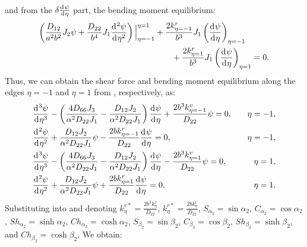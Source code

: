 \documentclass[preprint,12pt]{elsarticle}
\newcommand{\id}{\mathrm{d}\mkern1mu}
\begin{document}
%
and from the $\delta \frac{\id \psi}{\id \eta}$ part, the bending moment equilibrium:
%
\begin{equation}\label{eq:inertial_forcey2}	
 \begin{split}
 	\left( \frac{D_{12}}{a^2b^2} J_2 \psi + \frac{D_{22}}{b^4} J_1 \frac{\id^2 \psi}{\id \eta^2} \right) 
 	\Big|^{\eta=1}_{\eta=-1} 
 	&+ \frac{2k^r_{\eta=-1}}{b^3} J_1 \left( \frac{\id \psi}{\id \eta} \right)_{\eta=-1} \\
 	&\qquad+ \frac{2k^r_{\eta=1}}{b^3} J_1 \left( \frac{\id \psi}{\id \eta} \right)_{\eta=1}=0.
 \end{split}
\end{equation}
%
Thus, we can obtain the shear force and bending moment equilibrium along the edges $\eta = -1$ and $\eta = 1$ from , respectively, as:
%
\begin{subequations}\label{eq:boundaryy}
	\begin{align}
		&  \frac{\id^3 \psi}{\id \eta^3}-\left( \frac{4D_{66}J_3}{\alpha^2D_{22}J_1}  - \frac{D_{12}J_2}{\alpha^2D_{22}J_1}  \right) \frac{\id \psi}{\id \eta} 
		+\frac{2b^3k^v_{\eta=-1}}{D_{22}}\psi=0,\quad &\eta=-1,\\
		& \frac{\id^2 \psi}{\id \eta^2}+\frac{D_{12}J_2}{\alpha^2D_{22}J_1} \psi -\frac{2bk^r_{\eta=-1}}{D_{22}}\frac{\id\psi }{\id \eta}=0,\quad &\eta=-1,\\
		&  \frac{\id^3 \psi}{\id \eta^3}-\left( \frac{4D_{66}J_3}{\alpha^2D_{22}J_1}  - \frac{D_{12}J_2}{\alpha^2D_{22}J_1}  \right) \frac{\id \psi}{\id \eta} 
		-\frac{2b^3k^v_{\eta=1}}{D_{22}}\psi=0,\quad &\eta=1,\\
		&\frac{\id^2 \psi}{\id \eta^2}+\frac{D_{12}J_2}{\alpha^2D_{22}J_1} \psi +\frac{2bk^r_{\eta=1}}{D_{22}}\frac{\id\psi }{\id \eta}=0,\quad &\eta=1.
	\end{align}
\end{subequations}
%
Substituting  into  and denoting
$k^{v*}_{\eta} = \frac{2b^3 k^v_{\eta}}{D_{22}} $, 
$ k^{r*}_{\eta} = \frac{2b k^r_{\eta}}{D_{22}} $, 
$S_{\alpha_2}=\sin\alpha_2  $, 
$ C_{\alpha_2}=\cos\alpha_2  $, 
$ Sh_{\alpha_2}=\sinh\alpha_2  $, 
$ Ch_{\alpha_2}=\cosh\alpha_2 $, 
$ S_{\beta_2}=\sin\beta_2 $, 
$ C_{\beta_2}=\cos\beta_2 $, 
$ Sh_{\beta_2}=\sinh\beta_2$, and 
$Ch_{\beta_2}= \cosh\beta_2$, 
We obtain:
%
\end{document}
